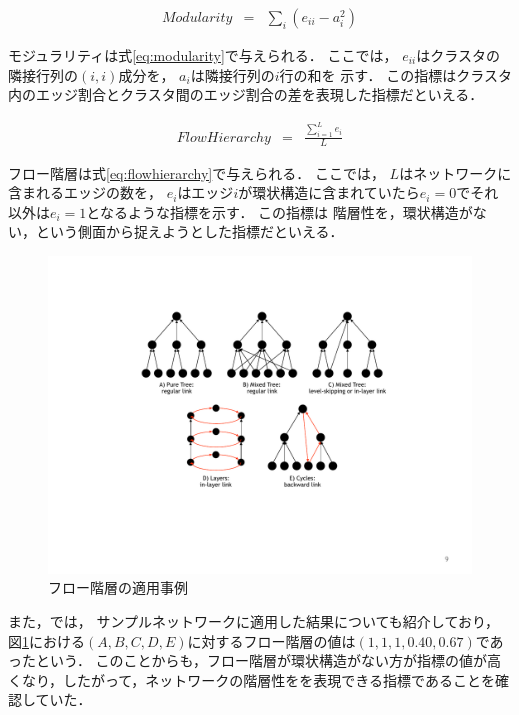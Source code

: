 \begin{eqnarray}
	\label{eq:modularity}
	Modularity &=& \sum_i(e_{ii} −a^2_i)
\end{eqnarray}

モジュラリティは式\ref{eq:modularity}で与えられる．
ここでは，
$e_{ii}$はクラスタの隣接行列の$(i, i)$成分を，
$a_i$は隣接行列の$i$行の和を
示す．
この指標はクラスタ内のエッジ割合とクラスタ間のエッジ割合の差を表現した指標だといえる．


\begin{eqnarray}
	\label{eq:flowhierarchy}
	FlowHierarchy &=& \frac{\sum^L_{i=1}e_{i}}{L} 
\end{eqnarray}

フロー階層は式\ref{eq:flowhierarchy}で与えられる．
ここでは，
$L$はネットワークに含まれるエッジの数を，
$e_{i}$はエッジ$i$が環状構造に含まれていたら$e_{i}=0$でそれ以外は$e_{i}=1$となるような指標を示す．
この指標は
階層性を，環状構造がない，という側面から捉えようとした指標だといえる．

\begin{figure}[htb]
\begin{center}
\includegraphics[width=350pt]{./img/flow2.pdf}
\end{center}
\caption{フロー階層の適用事例}
\label{fig:flow}
\end{figure}
また，\cite{luo2011detecting}では，
サンプルネットワークに適用した結果についても紹介しており，
図\ref{fig:flow}における$(A, B, C, D, E)$に対するフロー階層の値は$(1, 1, 1, 0.40, 0.67)$であったという．
このことからも，フロー階層が環状構造がない方が指標の値が高くなり，したがって，ネットワークの階層性をを表現できる指標であることを確認していた．





